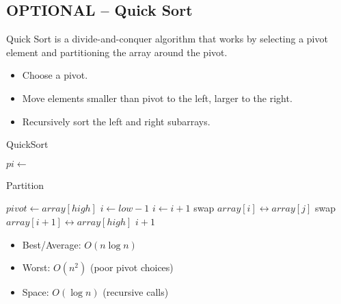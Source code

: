 \documentclass[a4paper,12pt]{article}
\begin{document}
\newpage

\subsection{OPTIONAL -- Quick Sort}

Quick Sort is a divide-and-conquer algorithm that works by selecting a pivot element and partitioning the array around the pivot.

\begin{itemize}
    \item Choose a pivot.
    \item Move elements smaller than pivot to the left, larger to the right.
    \item Recursively sort the left and right subarrays.
\end{itemize}

\begin{algorithm}[H]
\caption{QuickSort}
\begin{algorithmic}[1]
        \State $pi \gets$ 
        \State {}
        \State {}
    \EndIf
\EndProcedure
\end{algorithmic}
\end{algorithm}


\begin{algorithm}[H]
\caption{Partition}
\begin{algorithmic}[1]
    \State $pivot \gets array[high]$
    \State $i \gets low - 1$
            \State $i \gets i + 1$
            \State swap $array[i] \leftrightarrow array[j]$
        \EndIf
    \EndFor
    \State swap $array[i + 1] \leftrightarrow array[high]$
    \State \Return $i + 1$
\EndProcedure
\end{algorithmic}
\end{algorithm}

\begin{itemize}
    \item Best/Average: $O(n \log n)$
    \item Worst: $O(n^2)$ (poor pivot choices)
    \item Space: $O(\log n)$ (recursive calls)
\end{itemize}

\newpage
\end{document}
